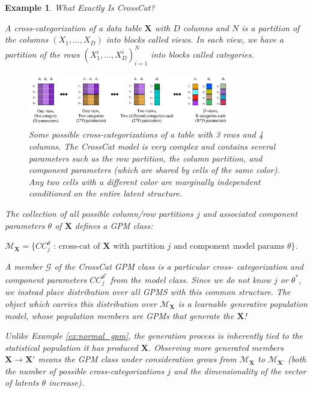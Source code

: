 \documentclass[10pt,letterpaper]{article}
\newtheorem{example}{Example}[section]
\newcommand{\set}[1]{\{#1\}}
\begin{document}
\begin{example} \label{ex:crosscat} What Exactly Is CrossCat?

A cross-categorization of a data table $\mathbf{X}$ with $D$ columns and $N$ is
a partition of the columns $(X_1,\dots,X_D)$ into blocks called \textit{views}.
In each view, we have a partition of the rows $(X_1^{i},\dots,X_D^{i})_{i=1}^N$
into blocks called \textit{categories}.

\begin{figure}[ht]
    \centering
\includegraphics[width=0.8\textwidth]{cc.jpeg}
\caption{Some possible cross-categorizations of a table with 3 rows and 4
columns. The CrossCat model is very complex and contains several parameters such
as the row partition, the column partition, and component parameters (which are
shared by cells of the same color). Any two cells with a different color are
marginally independent conditioned on the entire latent structure.}
\label{fig:cc}
\end{figure}
The collection of all possible column/row partitions $j$ and associated
component parameters $\theta$ of $\mathbf{X}$ defines a GPM class:

$\mathcal{M}_\textbf{X} = \set{CC_j^{\theta} \text{ : cross-cat of } \mathbf{X}
\text{ with partition } j \text{ and component model params } \theta}$.

A member $\mathcal{G}$ of the CrossCat GPM class is a particular cross-
categorization and component parameters $CC_j^{\theta^*}$ from the model class.
Since we do not know $j$ or $\theta^*$, we instead place distribution over all
GPMS with this common structure. The object which carries this distribution over
$\mathcal{M}_\textbf{X}$ is a learnable generative population model, whose
population members are GPMs that generate the $\mathbf{X}$!

Unlike Example \ref{ex:normal_gpm}, the generation process is inherently tied to
the statistical population it has produced $\mathbf{X}$. Observing more
generated members $\mathbf{X} \to
\mathbf{X}'$ means the GPM class under consideration grows from
$\mathcal{M}_\textbf{X}$ to $\mathcal{M}_\textbf{X'}$ (both the number of
possible cross-categorizations $j$ and the dimensionality of the vector of
latents $\theta$ increase).

\end{example}
\end{document}
